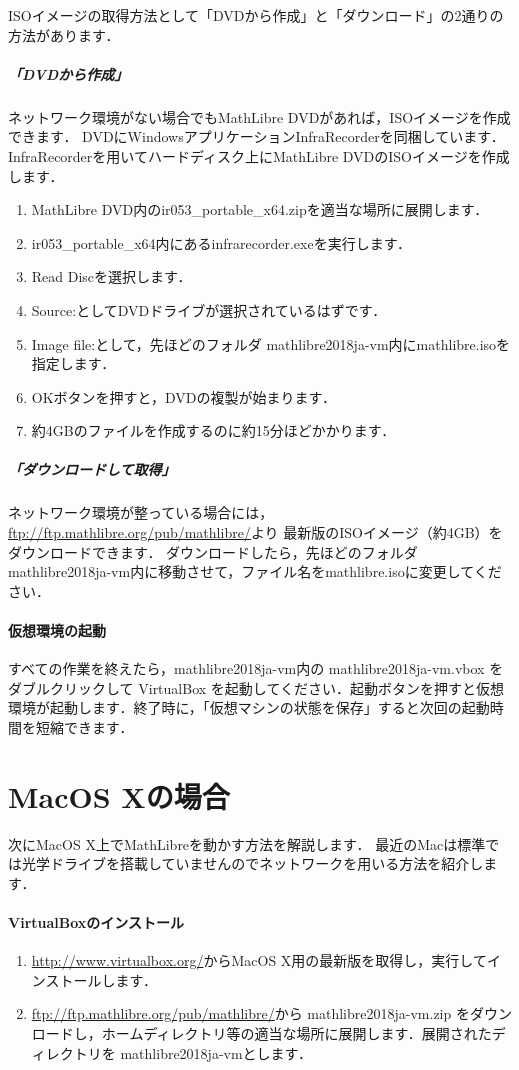 \documentclass[a4j]{ltjsarticle}
\newcommand{\ir}{ir053\_portable\_x64}
\newcommand{\vm}{mathlibre2018ja-vm}
\begin{document}
ISOイメージの取得方法として「DVDから作成」と「ダウンロード」の2通りの方法があります．
\subparagraph{「DVDから作成」}
ネットワーク環境がない場合でもMathLibre DVDがあれば，ISOイメージを作成できます．
DVDにWindowsアプリケーションInfraRecorderを同梱しています．
InfraRecorderを用いてハードディスク上にMathLibre DVDのISOイメージを作成
します．
\begin{enumerate}
 \item MathLibre DVD内の\ir.zipを適当な場所に展開します．
 \item \ir 内にあるinfrarecorder.exeを実行します．
 \item Read Discを選択します．
 \item Source:としてDVDドライブが選択されているはずです．
 \item Image file:として，先ほどのフォルダ \vm 内にmathlibre.isoを指定します．
 \item OKボタンを押すと，DVDの複製が始まります．
 \item 約4GBのファイルを作成するのに約15分ほどかかります．
\end{enumerate}
\subparagraph{「ダウンロードして取得」}

ネットワーク環境が整っている場合には，
\url{ftp://ftp.mathlibre.org/pub/mathlibre/}より
最新版のISOイメージ（約4GB）をダウンロードできます．
ダウンロードしたら，先ほどのフォルダ \vm 内に移動させて，ファイル名をmathlibre.isoに変更してください．

\paragraph{仮想環境の起動}
すべての作業を終えたら，\vm 内の \vm.vbox をダブルクリックして
VirtualBox を起動してください．起動ボタンを押すと仮想環境が起動します．終了時に，「仮想マシンの状態を保存」すると次回の起動時間を短縮できます．

\section{MacOS Xの場合}
次にMacOS X上でMathLibreを動かす方法を解説します．
最近のMacは標準では光学ドライブを搭載していませんのでネットワークを用いる方法を紹介します．

\paragraph{VirtualBoxのインストール}
\begin{enumerate}
 \item \url{http://www.virtualbox.org/}からMacOS X用の最新版を取得し，実行してインストールします．
 \item \url{ftp://ftp.mathlibre.org/pub/mathlibre/}から \vm.zip をダウンロードし，ホームディレクトリ等の適当な場所に展開します．展開されたディレクトリを \vm とします．
\end{enumerate}
\end{document}
